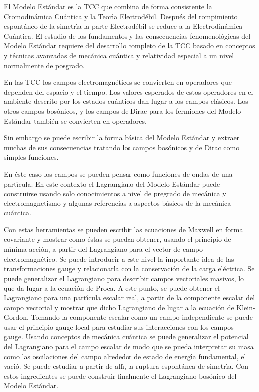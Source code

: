 El Modelo Est\'andar es la TCC que combina de forma consistente la Cromodin\'amica Cu\'antica y la Teor\'\i a Electrod\'ebil. Despu\'es del rompimiento espont\'aneo de la simetr\'\i a la parte Electrod\'ebil se reduce a la Electrodin\'amica Cu\'antica. El estudio de los fundamentos y las consecuencias fenomenol\'ogicas del Modelo Est\'andar requiere del desarrollo completo de la TCC basado en conceptos y t\'ecnicas avanzadas de mec\'anica cu\'antica y relatividad especial a un nivel normalmente de posgrado. 

En las TCC los campos electromagn\'eticos se convierten en operadores que dependen del espacio y el tiempo. Los valores esperados de estos operadores en el ambiente descrito por los estados cu\'anticos dan lugar a los campos cl\'asicos. Los otros campos bos\'onicos, y los campos de Dirac para los fermiones del Modelo Est\'andar tambi\'en se convierten en operadores. 

Sin embargo se puede  escribir la forma b\'asica del Modelo Est\'andar y extraer muchas de sus consecuencias tratando los campos bos\'onicos y de Dirac como simples funciones. 

En \'este caso los campos se pueden pensar como funciones de ondas de una part\'\i cula. En este contexto el Lagrangiano del Modelo Est\'andar puede construirse usando solo conocimientos a nivel de pregrado de mec\'anica y electromagnetismo y  algunas referencias a aspectos b\'asicos de la mec\'anica cu\'antica. 

Con estas herramientas se pueden escribir las ecuaciones de Maxwell en forma covariante y mostrar como \'estas se pueden obtener, usando el principio de m\'\i nima acci\'on, a partir del Lagrangiano para el vector de campo electromagn\'etico. Se puede introducir a este nivel la importante idea de las transformaciones gauge y relacionarla con la conservaci\'on de la carga el\'ectrica. Se puede generalizar el Lagrangiano  para describir campos vectoriales masivos, lo que da lugar a la ecuaci\'on de Proca. A este punto, se puede obtener el Lagrangiano para una part\'\i cula escalar real, a partir de la componente escalar del campo vectorial y mostrar que dicho Lagrangiano de lugar a la ecuaci\'on de Klein-Gordon. Tomando la componente escalar como un campo independiente se puede usar el principio gauge local para estudiar sus interacciones con los campos gauge. Usando conceptos de mec\'anica cu\'antica se puede generalizar el potencial del Lagrangiano para el campo escalar de modo que se pueda  interpretar su masa como las oscilaciones del campo alrededor de estado de energ\'\i a fundamental, el vaci\'o. Se puede estudiar a partir de all\'\i, la ruptura espont\'anea de simetr\'\i a. Con estos ingredientes se puede construir finalmente el Lagrangiano bos\'onico del Modelo Est\'andar. 

